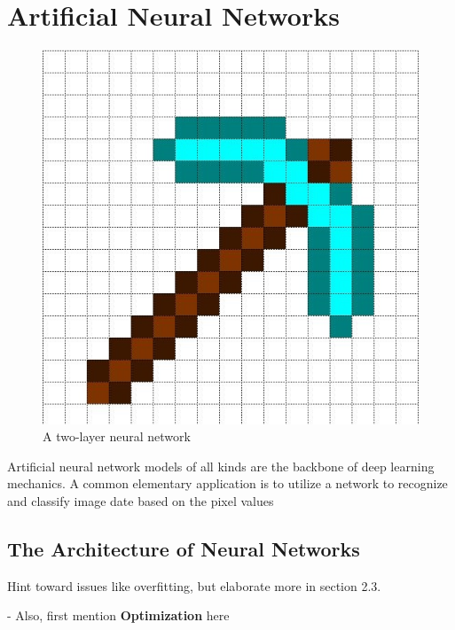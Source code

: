 \chapter{Artificial Neural Networks}

\begin{figure}
  \vspace{-90pt}
    \centering
    \includegraphics[width=.2\textwidth]{Figures/pickaxe.jpg}
    \caption{\footnotesize{A two-layer neural network}}
\end{figure}

Artificial neural network models of all kinds are the backbone of deep learning mechanics.  A common elementary application is to utilize a network to recognize and classify image date based on the pixel values








\section{The Architecture of Neural Networks} %

Hint toward issues like overfitting, but elaborate more in section 2.3.

- Also, first mention \textbf{Optimization} here






